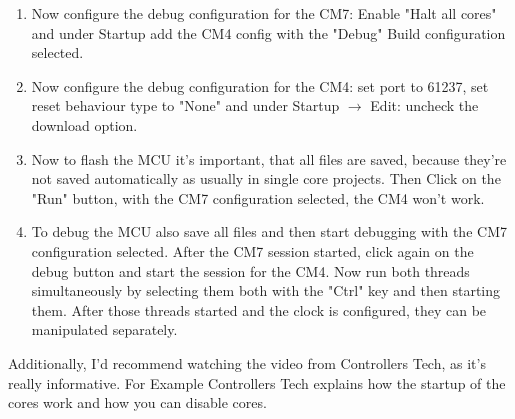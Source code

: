 \begin{enumerate}
		
		\begin{codeblock}
			
		\end{codeblock}
	\item Now configure the debug configuration for the CM7: Enable "Halt all cores" and under Startup add the CM4 config with the "Debug" Build configuration selected.
	\item Now configure the debug configuration for the CM4: set port to 61237, set reset behaviour type to "None" and under Startup \(\rightarrow\) Edit: uncheck the download option.
	\item Now to flash the MCU it's important, that all files are saved, because they're not saved automatically as usually in single core projects. Then Click on the "Run" button, with the CM7 configuration selected, the CM4 won't work.
	\item To debug the MCU also save all files and then start debugging with the CM7 configuration selected. After the CM7 session started, click again on the debug button and start the session for the CM4. Now run both threads simultaneously by selecting them both with the "Ctrl" key and then starting them. After those threads started and the clock is configured, they can be manipulated separately.
\end{enumerate} 

Additionally, I'd recommend watching the video from Controllers Tech, as it's really informative. \cite{YT_CT_Mutlicore_Debugging} For Example Controllers Tech explains how the startup of the cores work and how you can disable cores.




